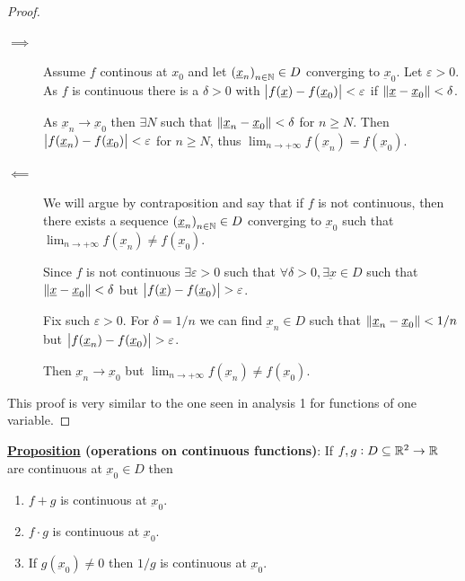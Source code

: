 \documentclass[10pt]{extarticle}
\renewcommand{\vec}[1]{\underbar{\ensuremath{#1}}}
\begin{document}
\begin{proof}
    \skiplineafterproof
    \begin{description}
        \item[$\implies$]
            Assume $f$ continous at $x_0$ and let $\left(\vec{x}_n\right)_{n \in \N} \in D$ converging to $\vec{x}_0$.
            Let $\varepsilon > 0$.
            As $f$ is continuous there is a $\delta > 0$ with $\abs{f(\vec{x}) - f(\vec{x}_0)} < \varepsilon$ if $\norm{\vec{x} - \vec{x}_0} < \delta$.

            As $\vec{x}_n \to \vec{x}_0$ then $\exists N$ such that $\norm{\vec{x}_n - \vec{x}_0} < \delta$ for $n \geq N$.
            Then $\abs{f(\vec{x}_n) - f(\vec{x}_0)} < \varepsilon$ for $n \geq N$, thus $\lim_{n \to +\infty} f(\vec{x}_n) = f(\vec{x}_0)$.

        \item[$\impliedby$]
            We will argue by contraposition and say that if $f$ is not continuous, then there exists a sequence $\left(\vec{x}_n\right)_{n \in \N} \in D$ converging to $\vec{x}_0$ such that $\lim_{n \to +\infty} f(\vec{x}_n) \neq f(\vec{x}_0)$.

            Since $f$ is not continuous $\exists \varepsilon > 0$ such that $\forall \delta > 0, \exists \vec{x} \in D$ such that $\norm{\vec{x} - \vec{x}_0} < \delta$ but $\abs{f(\vec{x}) - f(\vec{x}_0)} > \varepsilon$.

            Fix such $\varepsilon > 0$. For $\delta = 1/n$ we can find $\vec{x}_n \in D$ such that $\norm{\vec{x}_n - \vec{x}_0} < 1/n$ but $\abs{f(\vec{x}_n) - f(\vec{x}_0)} > \varepsilon$.

            Then $\vec{x}_n \to \vec{x}_0$ but $\lim_{n \to +\infty} f(\vec{x}_n) \neq f(\vec{x}_0)$.
    \end{description}

    This proof is very similar to the one seen in analysis 1 for functions of one variable.
\end{proof}

\textbf{\underline{Proposition} (operations on continuous functions)}:
If $f, g: D \subseteq \mathbb{R}^2 \to \mathbb{R}$ are continuous at $\vec{x}_0 \in D$ then
\begin{enumerate}[label=\roman*.]
    \item $f + g$ is continuous at $\vec{x}_0$.
    \item $f \cdot g$ is continuous at $\vec{x}_0$.
    \item If $g(\vec{x}_0) \neq 0$ then $1/g$ is continuous at $\vec{x}_0$.
\end{enumerate}
\end{document}
